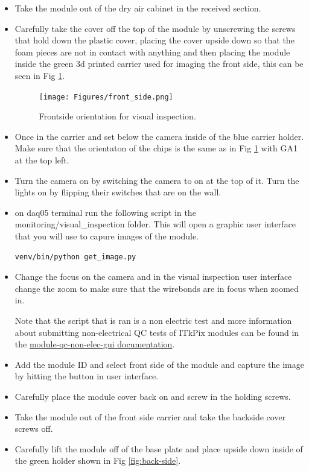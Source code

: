 \documentclass[12pt]{article}
\begin{document}
\begin{itemize}
    \item Take the module out of the dry air cabinet in the received section. 
    \item Carefully take the cover off the top of the module by unscrewing the screws that hold down the plastic cover, placing the cover upside down so that the foam pieces are not in contact with anything and then placing the module inside the green 3d printed carrier used for imaging the front side, this can be seen in Fig \ref{fig:front-side}.
\begin{figure}[H]
    \centering
    \texttt{[image: Figures/front\_side.png]}
    \caption{Frontside orientation for visual inspection.}
    \label{fig:front-side}
\end{figure}
    
    \item Once in the carrier and set below the camera inside of the blue carrier holder. Make sure that the orientaton of the chips is the same as in Fig \ref{fig:front-side} with GA1 at the top left. 
    \item Turn the camera on by switching the camera to on at the top of it. Turn the lights on by flipping their switches that are on the wall. 

    \item on daq05 terminal run the following script in the monitoring/visual\_inspection folder. This will open a graphic user interface that you will use to capure images of the module. 
\begin{verbatim}
venv/bin/python get_image.py
\end{verbatim}

    \item Change the focus on the camera and in the visual inspection user interface change the zoom to make sure that the wirebonds are in focus when zoomed in. 

Note that the script that is ran is a non electric test and more information about submitting non-electrical QC tests of ITkPix modules can be found in the \href{https://pypi.org/project/module-qc-nonelec-gui/}{module-qc-non-elec-gui documentation}.

    \item Add the module ID and select front side of the module and capture the image by hitting the button in user interface.
    
    \item Carefully place the module cover back on and screw in the holding screws. 
    \item Take the module out of the front side carrier and take the backside cover screws off. 
    \item Carefully lift the module off of the base plate and place upside down inside of the green holder shown in Fig \ref{fig:back-side}.  


\end{itemize}
\end{document}
